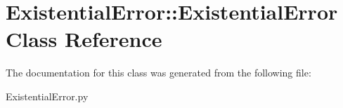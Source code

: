 \hypertarget{classExistentialError_1_1ExistentialError}{
\section{ExistentialError::ExistentialError Class Reference}
\label{classExistentialError_1_1ExistentialError}
}


The documentation for this class was generated from the following file:\begin{DoxyCompactItemize}
\item 
ExistentialError.py\end{DoxyCompactItemize}

